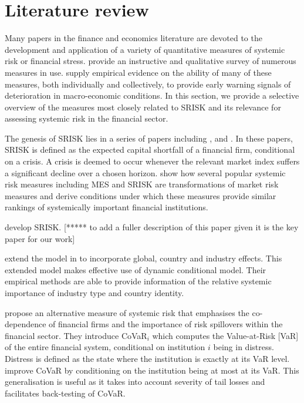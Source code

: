 \documentclass[authoryear]{elsarticle}
\begin{document}
\section{Literature review}\label{litrev}
Many papers in the finance and economics literature are devoted to the development and application of a variety of quantitative measures of systemic risk or financial stress. \cite{Bisias2012} provide an instructive and qualitative survey of numerous measures in use. \cite{Giglio2015} supply empirical evidence on the ability of many of these measures, both individually and collectively, to provide early warning signals of deterioration in macro-economic conditions. In this section, we provide a selective overview of the measures most closely related to SRISK and its relevance for assessing systemic risk in the financial sector. 

The genesis of SRISK lies in a series of papers including \cite{acharya2012capital}, \cite{acharya2012measuring} and \cite{brownlees2010volatility}. In these papers, SRISK is defined as the expected capital shortfall of a financial firm, conditional on a crisis. A crisis is deemed to occur whenever the relevant market index suffers a significant decline over a chosen horizon. \cite{Benoit2013} show how several popular systemic risk measures including MES and SRISK are transformations of market risk measures and derive conditions under which these measures provide similar rankings of systemically important financial institutions.


\cite{brownlees2015} develop SRISK. [***** to add a fuller description of this paper given it is the key paper for our work] 

\cite{Engle2015} extend the model in \cite{brownlees2015} to incorporate global, country and industry effects. This extended model makes effective use of \cite{Engle2014dcb} dynamic conditional model. Their empirical methods are able to provide information of the relative systemic importance of industry type and country identity. 

\cite{adrian2011covar} propose an alternative measure of systemic risk that emphasises the co-dependence of financial firms and the importance of risk spillovers within the financial sector. They introduce CoVaR$_i$ which computes the Value-at-Risk [VaR] of the entire financial system, conditional on institution $i$ being in distress. Distress is defined as the state where the institution is exactly at its VaR level. \cite{Girardi2013} improve CoVaR by conditioning on the institution being at most at its VaR. This generalisation is useful as it takes into account severity of tail losses and facilitates back-testing of CoVaR. 
\end{document}
